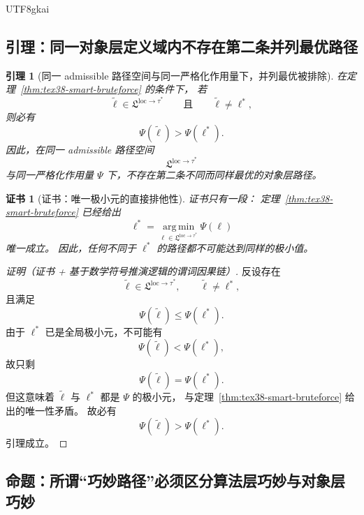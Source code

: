 \documentclass[12pt]{article}
\newtheorem{lemma}{引理}[section]
\newtheorem{Certificate}{证书}[section]
\begin{document}
\begin{CJK*}{UTF8}{gkai}
\subsection{引理：同一对象层定义域内不存在第二条并列最优路径}
\label{subsec:tex38-smart-lemma}

\begin{lemma}[同一 admissible 路径空间与同一严格化作用量下，并列最优被排除]
\label{lem:tex38-smart-unique-object}
在定理~\ref{thm:tex38-smart-bruteforce} 的条件下，
若
\[
  \widetilde\ell\in\mathfrak L^{\mathrm{loc}\to\tau^\ast}
  \qquad\text{且}\qquad
  \widetilde\ell\neq\ell^\ast,
\]
则必有
\[
  \Psi(\widetilde\ell)>\Psi(\ell^\ast).
\]
因此，在同一 admissible 路径空间
\[
  \mathfrak L^{\mathrm{loc}\to\tau^\ast}
\]
与同一严格化作用量 $\Psi$ 下，不存在第二条不同而同样最优的对象层路径。
\end{lemma}

\begin{Certificate}[证书：唯一极小元的直接排他性]
\label{cert:tex38-smart-unique-object}
证书只有一段：
定理~\ref{thm:tex38-smart-bruteforce} 已经给出
\[
  \ell^\ast
  =
  \operatorname*{arg\,min}_{\ell\in\mathfrak L^{\mathrm{loc}\to\tau^\ast}}
  \Psi(\ell)
\]
唯一成立。
因此，任何不同于 $\ell^\ast$ 的路径都不可能达到同样的极小值。
\end{Certificate}

\begin{proof}[证明（证书 + 基于数学符号推演逻辑的谓词因果链）]
反设存在
\[
  \widetilde\ell\in\mathfrak L^{\mathrm{loc}\to\tau^\ast},
  \qquad
  \widetilde\ell\neq\ell^\ast,
\]
且满足
\[
  \Psi(\widetilde\ell)\le\Psi(\ell^\ast).
\]
由于 $\ell^\ast$ 已是全局极小元，不可能有
\[
  \Psi(\widetilde\ell)<\Psi(\ell^\ast),
\]
故只剩
\[
  \Psi(\widetilde\ell)=\Psi(\ell^\ast).
\]
但这意味着 $\widetilde\ell$ 与 $\ell^\ast$ 都是 $\Psi$ 的极小元，
与定理~\ref{thm:tex38-smart-bruteforce} 给出的唯一性矛盾。
故必有
\[
  \Psi(\widetilde\ell)>\Psi(\ell^\ast).
\]
引理成立。
\end{proof}

\subsection{命题：所谓“巧妙路径”必须区分算法层巧妙与对象层巧妙}
\label{subsec:tex38-smart-proposition}


\end{CJK*}
\end{document}
